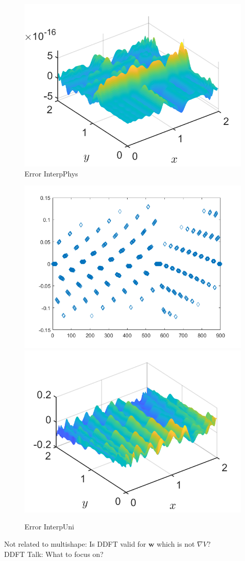 \documentclass[11pt, a4paper]{article}
\theoremstyle{definition}
\newcommand{\w}{\mathbf{w}}
\begin{document}
\begin{figure}[h]
	\centering
	\includegraphics[scale=0.4]{ErrPhys.png}
	\caption{Error InterpPhys} 
	\label{F2}
\end{figure}

\begin{figure}[h]
	\centering
	\includegraphics[scale=0.4]{ErrUni1.png}
	\includegraphics[scale=0.4]{ErrUni2.png}
	\caption{Error InterpUni} 
	\label{F3}
\end{figure}




Not related to multishape: Is DDFT valid for $\w$ which is not $\nabla V$?\\
DDFT Talk: What to focus on?
\end{document}
